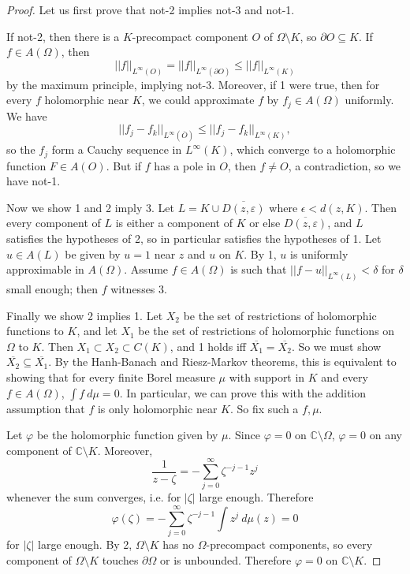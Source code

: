 \documentclass[12pt]{report}
\newcommand{\CC}{\mathbb{C}}
\theoremstyle{definition}
\begin{document}
\begin{proof}
    Let us first prove that not-2 implies not-3 and not-1.

    If not-2, then there is a $K$-precompact component $O$ of $\Omega \setminus K$, so $\partial O \subseteq K$. If $f \in A(\Omega)$, then
    $$||f||_{L^\infty(O)} = ||f||_{L^\infty(\partial O)} \leq ||f||_{L^\infty(K)}$$
    by the maximum principle, implying not-3. Moreover, if 1 were true, then for every $f$ holomorphic near $K$, we could approximate $f$ by $f_j \in A(\Omega)$ uniformly. We have
    $$||f_j - f_k||_{L^\infty(\overline O)} \leq ||f_j - f_k||_{L^\infty(K)},$$
    so the $f_j$ form a Cauchy sequence in $L^\infty(K)$, which converge to a holomorphic function $F \in A(O)$. But if $f$ has a pole in $O$, then $f \neq O$, a contradiction, so we have not-1.

    Now we show 1 and 2 imply 3. Let $L = K \cup \overline{D(z, \varepsilon)}$ where $\epsilon < d(z, K)$. Then every component of $L$ is either a component of $K$ or else $\overline{D(z, \varepsilon)}$, and $L$ satisfies the hypotheses of 2, so in particular satisfies the hypotheses of 1. Let $u \in A(L)$ be given by $u = 1$ near $z$ and $u$ on $K$. By 1, $u$ is uniformly approximable in $A(\Omega)$. Assume $f \in A(\Omega)$ is such that $||f - u||_{L^\infty(L)} < \delta$ for $\delta$ small enough; then $f$ witnesses 3.

    Finally we show 2 implies 1. Let $X_2$ be the set of restrictions of holomorphic functions to $K$, and let $X_1$ be the set of restrictions of holomorphic functions on $\Omega$ to $K$. Then $X_1 \subset X_2 \subset C(K)$, and 1 holds iff $\overline{X_1} = \overline{X_2}$. So we must show $\overline{X_2} \subseteq \overline{X_1}$. By the Hanh-Banach and Riesz-Markov theorems, this is equivalent to showing that for every finite Borel measure $\mu$ with support in $K$ and every $f \in A(\Omega)$, $\int f ~d\mu = 0$. In particular, we can prove this with the addition assumption that $f$ is only holomorphic near $K$. So fix such a $f, \mu$.

    Let $\varphi$ be the holomorphic function given by $\mu$. Since $\varphi = 0$ on $\CC \setminus \Omega$, $\varphi = 0$ on any component of $\CC \setminus K$. Moreover,
    $$\frac{1}{z - \zeta} = -\sum_{j=0}^\infty \zeta^{-j-1}z^j$$
    whenever the sum converges, i.e. for $|\zeta|$ large enough. Therefore
    $$\varphi(\zeta) = -\sum_{j=0}^\infty \zeta^{-j-1} \int z^j ~d\mu(z) = 0$$
    for $|\zeta|$ large enough. By 2, $\Omega \setminus K$ has no $\Omega$-precompact components, so every component of $\Omega \setminus K$ touches $\partial \Omega$ or is unbounded. Therefore $\varphi = 0$ on $\CC \setminus K$.


\end{proof}
\end{document}

